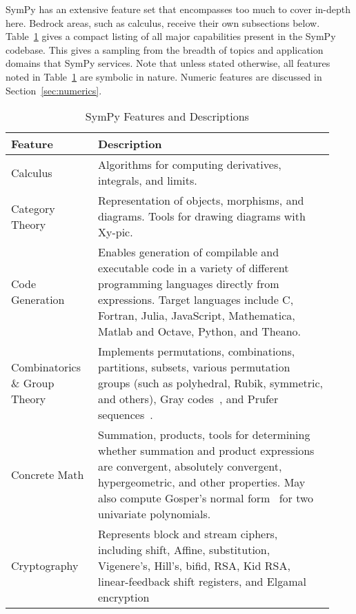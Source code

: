 
SymPy has an extensive feature set that encompasses too much to cover in-depth
here. Bedrock areas, such as calculus, receive their own subsections below.
Table~\ref{features-table} gives a compact listing of all major capabilities
present in the SymPy codebase. This gives a sampling from the breadth of
topics and application domains that SymPy services. Note that unless stated
otherwise, all features noted in Table~\ref{features-table} are symbolic in
nature. Numeric features are discussed in Section~\ref{sec:numerics}.

\begin{longtable}[htbc]{p{0.25\linewidth}p{0.68\linewidth}}
\caption{SymPy Features and Descriptions\label{features-table}}\\
\toprule
\textbf{Feature} & \textbf{Description} \\
\midrule
Calculus & Algorithms for computing derivatives, integrals, and limits.\\

Category Theory & Representation of objects, morphisms, and diagrams. Tools
for drawing diagrams with Xy-pic.\\

Code Generation & Enables generation of compilable and executable code in a
variety of different programming languages directly from expressions. Target
languages include C, Fortran, Julia, JavaScript,
Mathematica, Matlab and Octave, Python, and Theano.\\

Combinatorics \& Group Theory & Implements permutations, combinations,
partitions, subsets, various permutation groups (such as polyhedral, Rubik,
symmetric, and others), Gray codes~\cite{Nijenhuis1978combinatorial},
and Prufer sequences~\cite{biggs1976graph}.\\

Concrete Math & Summation, products, tools for determining whether summation
and product expressions are convergent, absolutely convergent, hypergeometric,
and
other properties. May also compute Gosper's normal form~\cite{petkovvsek1996bak} for two univariate polynomials.\\

Cryptography & Represents block and stream ciphers, including shift, Affine,
substitution, Vigenere's, Hill's, bifid, RSA, Kid RSA,
linear-feedback shift registers, and Elgamal encryption\\


\end{longtable}
